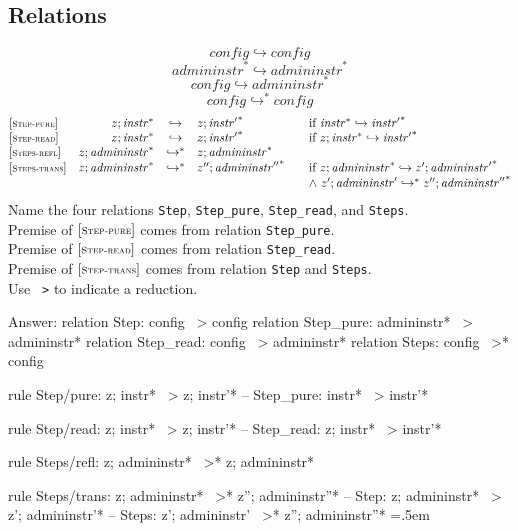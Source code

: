 \documentclass{article}
\newenvironment{lcverbatim}
 {\SaveVerbatim{cverb}}
 {\endSaveVerbatim
  \flushleft\fboxrule=0pt\fboxsep=.5em
  \colorbox{cverbbg}{%
    \makebox[\dimexpr\linewidth-2\fboxsep][l]{\BUseVerbatim{cverb}}%
  }
  \endflushleft
}
\newcommand\K[1]{\texttt{#1}}
\begin{document}
\subsection{Relations}
$$
\boxed{{\mathit{config}} \hookrightarrow {\mathit{config}}}
$$
$$
\boxed{{{\mathit{admininstr}}^\ast} \hookrightarrow {{\mathit{admininstr}}^\ast}}
$$
$$
\boxed{{\mathit{config}} \hookrightarrow {{\mathit{admininstr}}^\ast}}
$$
$$
\boxed{{\mathit{config}} \hookrightarrow^\ast {\mathit{config}}}
$$
$$
\begin{array}{@{}l@{}rcl@{}l@{}}
{[\textsc{\scriptsize Step{-}pure}]} \quad & z ; {{\mathit{instr}}^\ast} &\hookrightarrow& z ; {{\mathit{instr}'}^\ast}
  &\qquad \mbox{if}~{{\mathit{instr}}^\ast} \hookrightarrow {{\mathit{instr}'}^\ast} \\
{[\textsc{\scriptsize Step{-}read}]} \quad & z ; {{\mathit{instr}}^\ast} &\hookrightarrow& z ; {{\mathit{instr}'}^\ast}
  &\qquad \mbox{if}~z ; {{\mathit{instr}}^\ast} \hookrightarrow {{\mathit{instr}'}^\ast} \\
{[\textsc{\scriptsize Steps{-}refl}]} \quad & z ; {{\mathit{admininstr}}^\ast} &\hookrightarrow^\ast& z ; {{\mathit{admininstr}}^\ast} \\
{[\textsc{\scriptsize Steps{-}trans}]} \quad & z ; {{\mathit{admininstr}}^\ast} &\hookrightarrow^\ast& {z''} ; {{\mathit{admininstr}''}^\ast}
  &\qquad \mbox{if}~z ; {{\mathit{admininstr}}^\ast} \hookrightarrow {z'} ; {{\mathit{admininstr}'}^\ast} \\
  &&&&\qquad {\land}~{z'} ; {\mathit{admininstr}'} \hookrightarrow^\ast {z''} ; {{\mathit{admininstr}''}^\ast} \\
\end{array}
$$
Name the four relations \K{Step}, \K{Step\_pure}, \K{Step\_read}, and \K{Steps}. \\
Premise of $[\textsc{\scriptsize Step{-}pure}]$ comes from relation \K{Step\_pure}. \\
Premise of $[\textsc{\scriptsize Step{-}read}]$ comes from relation \K{Step\_read}. \\
Premise of $[\textsc{\scriptsize Step{-}trans}]$ comes from relation \K{Step} and \K{Steps}. \\
Use \K{~>} to indicate a reduction. \\
{\color{red}
	Answer:
	\begin{lcverbatim}
relation Step: config ~> config
relation Step_pure: admininstr* ~> admininstr*
relation Step_read: config ~> admininstr*
relation Steps: config ~>* config

rule Step/pure:
  z; instr*  ~>  z; instr'*
  -- Step_pure: instr* ~> instr'*

rule Step/read:
  z; instr*  ~>  z; instr'*
  -- Step_read: z; instr* ~> instr'*

rule Steps/refl:
  z; admininstr* ~>* z; admininstr*

rule Steps/trans:
  z; admininstr*  ~>*  z''; admininstr''*
  -- Step: z; admininstr*  ~>  z'; admininstr'*
  -- Steps: z'; admininstr'  ~>*  z''; admininstr''*
	\end{lcverbatim}
}
\end{document}
